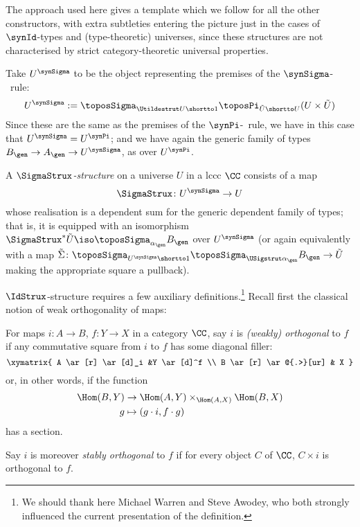 The approach used here gives a template which we follow for all the other constructors, with extra subtleties entering the picture just in the cases of $\synId$-types and (type-theoretic) universes, since these structures are not characterised by strict category-theoretic universal properties.
 
\begin{definition}
Take $U^{\synSigma}$ to be the object representing the premises of the $\synSigma$-\form\ rule:
\[ U^{\synSigma} := \toposSigma_{\Utildestrut U \shortto 1} \toposPi_{\tilde{U} \shortto U} (U \times \tilde{U}) \]
Since these are the same as the premises of the $\synPi$-\form\ rule, we have in this case that $U^{\synSigma} = U^{\synPi}$; and we have again the generic family of types $B_\gen \to A_\gen \to U^{\synSigma}$, as over $U^{\synPi}$.
\end{definition}

\begin{definition}
A \emph{$\SigmaStrux$-structure} on a universe $U$ in a lccc $\CC$ consists of a map
\[ \SigmaStrux \colon U^{\synSigma} \to U \]
whose realisation is a dependent sum for the generic dependent family of types; that is, it is equipped with an isomorphism $ \SigmaStrux^* \tilde{U} \iso \toposSigma_{\alpha_\gen} B_\gen$ over $U^\synSigma$ (or again equivalently with a map $\tilde{\Sigma} \colon \toposSigma_{U^{\synSigma} \shortto 1} \toposSigma_{\USigstrut \alpha_\gen} B_\gen \to \tilde{U}$ making the appropriate square a pullback).
\end{definition}

$\IdStrux$-structure requires a few auxiliary definitions.\footnote{We should thank here Michael Warren and Steve Awodey, who both strongly influenced the current presentation of the definition.} Recall first the classical notion of weak orthogonality of maps:
\begin{definition} \leavevmode 
For maps $i \colon A \to B$, $f \colon Y \to X$ in a category $\CC$, say $i$ is \emph{(weakly) orthogonal} to $f$ if any commutative square from $i$ to $f$ has some diagonal filler:
\[\xymatrix{ A \ar[r] \ar[d]_i &Y \ar[d]^f \\
              B \ar[r] \ar@{.>}[ur] & X }\]
or, in other words, if the function
\begin{align*}
\Hom (B,Y) & \to \Hom (A,Y) \times_{\Hom(A,X)} \Hom (B,X) \\
g & \mapsto (g \cdot i, f \cdot g)
\end{align*}
has a section.

Say $i$ is moreover \emph{stably orthogonal}  to $f$ if for every object $C$ of $\CC$, $C \times i$ is orthogonal to $f$.
\end{definition}

